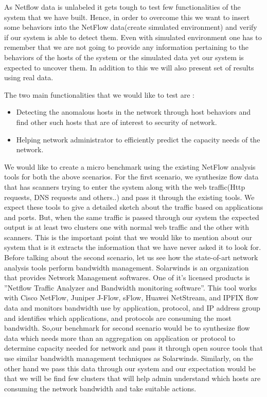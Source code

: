 As Netflow data is unlabeled it gets tough to test few functionalities of the system
that we have built. Hence, in order to overcome this we want to insert some behaviors
into the NetFlow data(create simulated environment) and verify if our system is able to
detect them. Even with simulated environment one has to remember that we are not going
to provide any information pertaining to the behaviors of the hosts of the system or the
simulated data yet our system is expected to uncover them. In addition to this we will also
present set of results using real data.




The two main functionalities that we would like to test are :
\begin{itemize}
	
	\item Detecting the anomalous hosts in the network through host behaviors and find other
	such hosts that are of interest to security of network.
	
	\item Helping network administrator to efficiently predict the capacity needs of the network.
\end{itemize}

We would like to create a micro benchmark using the existing NetFlow analysis tools
for both the above scenarios. For the first scenario, we synthesize flow data that has
scanners trying to enter the system along with the web traffic(Http requests, DNS requests
and others..) and pass it through the existing tools. We expect these tools to give a detailed
sketch about the traffic based on applications and ports. But, when the same traffic is
passed through our system the expected output is at least two clusters one with normal
web traffic and the other with scanners. This is the important point that we would like to
mention about our system that is it extracts the information that we have never asked it to
look for.
Before talking about the second scenario, let us see how the state-of-art network analysis
tools perform bandwidth management. Solarwinds is an organization that provides
Network Management softwares. One of it’s licensed products is ”Netflow Traffic Analyzer
and Bandwidth monitoring software”. This tool works with Cisco NetFlow, Juniper
J-Flow, sFlow, Huawei NetStream, and IPFIX flow data and monitors bandwidth use by
application, protocol, and IP address group and identifies which applications, and protocols
are consuming the most bandwidth. So,our benchmark for second scenario would be
to synthesize flow data which needs more than an aggregation on application or protocol
to determine capacity needed for network and pass it through open source tools that use
similar bandwidth management techniques as Solarwinds. Similarly, on the other hand
we pass this data through our system and our expectation would be that we will be find
few clusters that will help admin understand which hosts are consuming the network
bandwidth and take suitable actions.